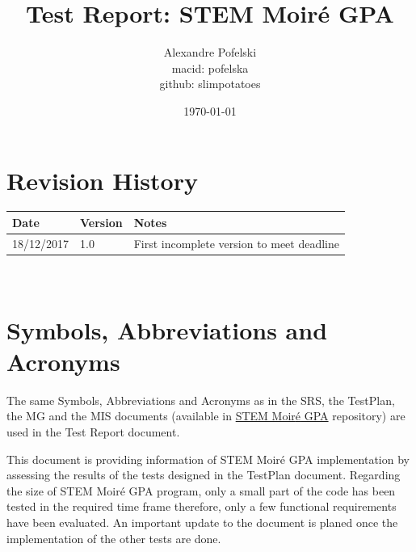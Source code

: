\documentclass[12pt, titlepage]{article}
\newcommand{\progname}{STEM Moir{\'e} GPA}
\begin{document}
\title{Test Report: STEM Moir{\'e} GPA} 
\author{Alexandre Pofelski \\
		macid: pofelska \\
		github: slimpotatoes}
\date{\today}
	
\maketitle


\section{Revision History}

\begin{tabularx}{\textwidth}{p{3cm}p{2cm}X}
\toprule {\bf Date} & {\bf Version} & {\bf Notes}\\
\midrule
18/12/2017 & 1.0 & First incomplete version to meet deadline\\
\bottomrule
\end{tabularx}

~\newpage

\section{Symbols, Abbreviations and Acronyms}

The same Symbols, Abbreviations and Acronyms as in the SRS, the TestPlan, the 
MG and the MIS documents (available in 
\href{https://github.com/slimpotatoes/STEM_Moire_GPA}{\progname{}} repository) 
are used in the Test Report document. 

\newpage

\tableofcontents

\listoftables %

\listoffigures %

\newpage


This document is providing information of \progname{} implementation by assessing the results of the tests designed in the TestPlan document. Regarding the size of \progname{} program, only a small part of the code has been tested in the required time frame therefore, only a few functional requirements have been evaluated. An important update to the document is planed once the implementation of the other tests are done.
\newline
\end{document}
